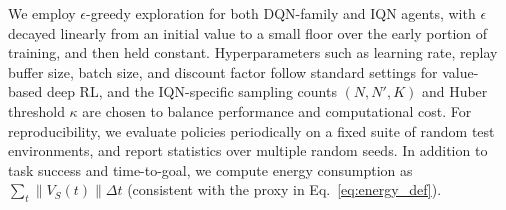We employ $\epsilon$-greedy exploration for both DQN-family and IQN agents, with $\epsilon$ decayed linearly from an initial value to a small floor over the early portion of training, and then held constant. Hyperparameters such as learning rate, replay buffer size, batch size, and discount factor follow standard settings for value-based deep RL, and the IQN-specific sampling counts $(N,N',K)$ and Huber threshold $\kappa$ are chosen to balance performance and computational cost.
For reproducibility, we evaluate policies periodically on a fixed suite of random test environments, and report statistics over multiple random seeds. In addition to task success and time-to-goal, we compute energy consumption as $\sum_t \|V_S(t)\|\Delta t$ (consistent with the proxy in Eq.~\eqref{eq:energy_def}).